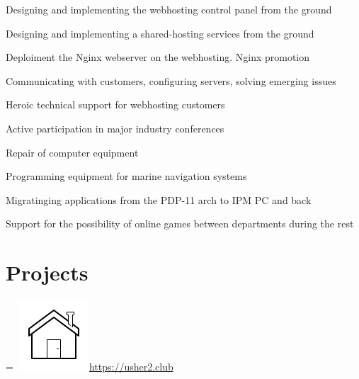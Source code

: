 \documentclass[]{schorscv}
\begin{document}
\begin{minipage}[t]{0.70\textwidth}
\begin{tightemize}
\sectionsep
\item Designing and implementing the webhosting control panel from the ground
\item Designing and implementing a shared-hosting services from the ground
\item Deploiment the Nginx webserver on the webhosting. Nginx promotion
\item Communicating with customers, configuring servers, solving emerging issues
\item Heroic technical support for webhosting customers
\item Active participation in major industry conferences
\end{tightemize}
\sectionsep

\begin{tightemize}
\sectionsep
\item Repair of computer equipment
\item Programming equipment for marine navigation systems
\item Migratinging applications from the PDP-11 arch to IPM PC and back
\item Support for the possibility of online games between departments during the rest
\end{tightemize}
\sectionsep



\section{Projects}

\begingroup
{}=\hbox{
\includegraphics[scale=0.1,trim={0 1.25cm -0.4cm 0cm}]{icons/main/home.png}\hspace{0.3cm}\href{https://usher2.club}{https://usher2.club}
}
\parbox{\wd0}{}\endgroup
\sectionsep


\end{minipage}
\end{document}
